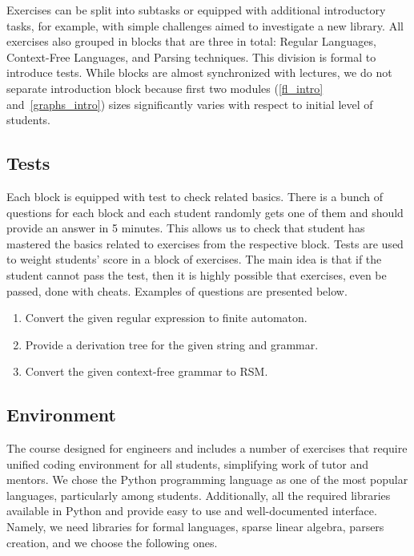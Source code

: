 \documentclass[sigconf]{acmart}
\begin{document}
Exercises can be split into subtasks or equipped with additional introductory tasks, for example, with simple challenges aimed to investigate a new library.
All exercises also grouped in blocks that are three in total: Regular Languages, Context-Free Languages, and Parsing techniques.
This division is formal to introduce tests.
While blocks are almost synchronized with lectures, we do not separate introduction block because first two modules (\ref{fl_intro} and~\ref{graphs_intro}) sizes significantly varies with respect to initial level of students.


\subsection{Tests}

Each block is equipped with test to check related basics.
There is a bunch of questions for each block and each student randomly gets one of them and should provide an answer in 5 minutes. 
This allows us to check that student has mastered the basics related to exercises from the respective block.
Tests are used to weight students' score in a block of exercises. 
The main idea is that if the student cannot pass the test, then it is highly possible that exercises, even be passed, done with cheats.
Examples of questions are presented below.
\begin{enumerate}
   \item Convert the given regular expression to finite automaton.
   \item Provide a derivation tree for the given string and grammar.
   \item Convert the given context-free grammar to RSM.
\end{enumerate}


\subsection{Environment}

The course designed for engineers and includes a number of exercises that require unified coding environment for all students, simplifying work of tutor and mentors.
We chose the Python programming language as one of the most popular languages, particularly among students.
Additionally, all the required libraries available in Python and provide easy to use and well-documented interface.
Namely, we need libraries for formal languages, sparse linear algebra, parsers creation, and we choose the following ones.
\end{document}
